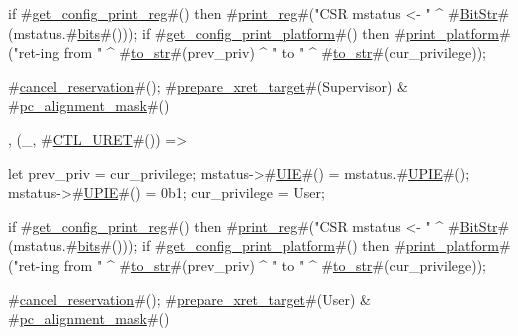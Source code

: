 {{{      if   #\hyperref[sailRISCVzgetzyconfigzyprintzyreg]{get\_config\_print\_reg}#()
      then #\hyperref[sailRISCVzprintzyreg]{print\_reg}#("CSR mstatus <- " ^ #\hyperref[sailRISCVzBitStr]{BitStr}#(mstatus.#\hyperref[sailRISCVzbits]{bits}#()));
      if   #\hyperref[sailRISCVzgetzyconfigzyprintzyplatform]{get\_config\_print\_platform}#()
      then #\hyperref[sailRISCVzprintzyplatform]{print\_platform}#("ret-ing from " ^ #\hyperref[sailRISCVztozystr]{to\_str}#(prev_priv)
                          ^ " to " ^ #\hyperref[sailRISCVztozystr]{to\_str}#(cur_privilege));

      #\hyperref[sailRISCVzcancelzyreservation]{cancel\_reservation}#();
      #\hyperref[sailRISCVzpreparezyxretzytarget]{prepare\_xret\_target}#(Supervisor) & #\hyperref[sailRISCVzpczyalignmentzymask]{pc\_alignment\_mask}#()
    },
    (_, #\hyperref[sailRISCVzCTLzyURET]{CTL\_URET}#())  => {
      let prev_priv   = cur_privilege;
      mstatus->#\hyperref[sailRISCVzUIE]{UIE}#()  = mstatus.#\hyperref[sailRISCVzUPIE]{UPIE}#();
      mstatus->#\hyperref[sailRISCVzUPIE]{UPIE}#() = 0b1;
      cur_privilege   = User;

      if   #\hyperref[sailRISCVzgetzyconfigzyprintzyreg]{get\_config\_print\_reg}#()
      then #\hyperref[sailRISCVzprintzyreg]{print\_reg}#("CSR mstatus <- " ^ #\hyperref[sailRISCVzBitStr]{BitStr}#(mstatus.#\hyperref[sailRISCVzbits]{bits}#()));
      if   #\hyperref[sailRISCVzgetzyconfigzyprintzyplatform]{get\_config\_print\_platform}#()
      then #\hyperref[sailRISCVzprintzyplatform]{print\_platform}#("ret-ing from " ^ #\hyperref[sailRISCVztozystr]{to\_str}#(prev_priv) ^ " to " ^ #\hyperref[sailRISCVztozystr]{to\_str}#(cur_privilege));

      #\hyperref[sailRISCVzcancelzyreservation]{cancel\_reservation}#();
      #\hyperref[sailRISCVzpreparezyxretzytarget]{prepare\_xret\_target}#(User) & #\hyperref[sailRISCVzpczyalignmentzymask]{pc\_alignment\_mask}#()
    }
  }
}
